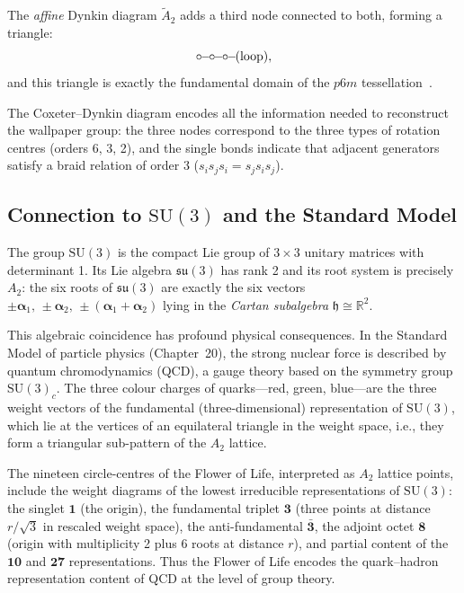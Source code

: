 The \emph{affine} Dynkin diagram \(\tilde{A}_2\) adds a third node
connected to both, forming a triangle:
\[
  \circ\!\!-\!\!\circ\!\!-\!\!\circ\!\!-\!\!({\rm loop}),
\]
and this triangle is exactly the fundamental domain of the \(p6m\)
tessellation~\cite{conway_sphere_packings}.

The Coxeter--Dynkin diagram encodes all the information needed to
reconstruct the wallpaper group: the three nodes correspond to the three
types of rotation centres (orders 6, 3, 2), and the single bonds indicate
that adjacent generators satisfy a braid relation of order 3
(\(s_is_j s_i = s_j s_i s_j\)).

\subsection{Connection to \(\mathrm{SU}(3)\) and the Standard Model}
\label{subsec:fol-su3}

The group \(\mathrm{SU}(3)\) is the compact Lie group of \(3\times 3\)
unitary matrices with determinant 1.  Its Lie algebra \(\mathfrak{su}(3)\)
has rank 2 and its root system is precisely \(A_2\): the six roots of
\(\mathfrak{su}(3)\) are exactly the six vectors
\(\pm\boldsymbol{\alpha}_1,\,\pm\boldsymbol{\alpha}_2,\,
\pm(\boldsymbol{\alpha}_1+\boldsymbol{\alpha}_2)\) lying in the
\emph{Cartan subalgebra} \(\mathfrak{h}\cong\mathbb{R}^2\).

This algebraic coincidence has profound physical consequences.
In the Standard Model of particle physics (Chapter~20),
the strong nuclear force is described by quantum chromodynamics (QCD),
a gauge theory based on the symmetry group \(\mathrm{SU}(3)_c\).
The three colour charges of quarks—red, green, blue—are the three
weight vectors of the fundamental (three-dimensional) representation
of \(\mathrm{SU}(3)\), which lie at the vertices of an equilateral
triangle in the weight space, i.e., they form a triangular sub-pattern
of the \(A_2\) lattice.

\begin{remark}
The nineteen circle-centres of the Flower of Life, interpreted as
\(A_2\) lattice points, include the weight diagrams of the lowest
irreducible representations of \(\mathrm{SU}(3)\):
the singlet \(\mathbf{1}\) (the origin),
the fundamental triplet \(\mathbf{3}\) (three points at distance
\(r/\sqrt{3}\) in rescaled weight space),
the anti-fundamental \(\bar{\mathbf{3}}\),
the adjoint octet \(\mathbf{8}\) (origin with multiplicity 2 plus 6
roots at distance \(r\)),
and partial content of the \(\mathbf{10}\) and \(\mathbf{27}\)
representations.
Thus the Flower of Life encodes the quark–hadron representation
content of QCD at the level of group theory.
\end{remark}


